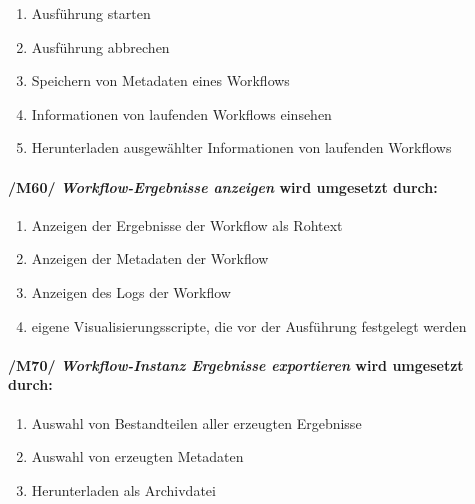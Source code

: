 \begin{enumerate}
    \setlength\itemsep{-1em}
    \setcounter{enumi}{\value{FAs}}
    \item Ausführung starten
    \item Ausführung abbrechen
    \item Speichern von Metadaten eines \glspl{Workflow}
    \item Informationen von laufenden Workflows einsehen
    \item Herunterladen ausgewählter Informationen von laufenden Workflows
    \setcounter{FAs}{\value{enumi}}
\end{enumerate}

\paragraph{/M60/ \textit{\gls{Workflow}-Ergebnisse anzeigen} wird umgesetzt durch:}
\begin{enumerate}
    \setlength\itemsep{-1em}
    \setcounter{enumi}{\value{FAs}}
    \item Anzeigen der Ergebnisse der \gls{Workflow} als Rohtext
    \item Anzeigen der Metadaten der \gls{Workflow}
    \item Anzeigen des Logs der \gls{Workflow}
    \item eigene Visualisierungsscripte, die vor der Ausführung festgelegt werden
    \setcounter{FAs}{\value{enumi}}
\end{enumerate}

\paragraph{/M70/ \textit{Workflow-Instanz Ergebnisse exportieren} wird umgesetzt durch:}
\begin{enumerate}
    \setlength\itemsep{-1em}
    \setcounter{enumi}{\value{FAs}}
    \item Auswahl von Bestandteilen aller erzeugten Ergebnisse
    \item Auswahl von erzeugten Metadaten
    \item Herunterladen als Archivdatei
    \setcounter{FAs}{\value{enumi}}
\end{enumerate}


